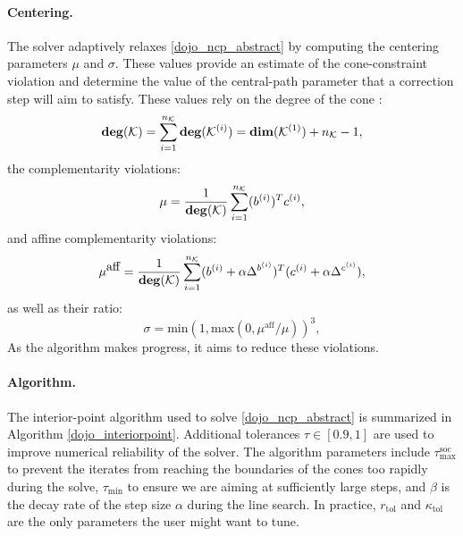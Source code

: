 \paragraph{Centering.}
The solver adaptively relaxes \eqref{dojo_ncp_abstract} by computing the centering parameters $\mu$ and $\sigma$. These values provide an estimate of the cone-constraint violation and determine the value of the central-path parameter that a correction step will aim to satisfy. These values rely on the degree of the cone \cite{vandenberghe2010cvxopt}:
\begin{equation}
	\mbox{\textbf{deg}}(\mathcal{K}) = \sum_{i=1}^{n_{\mathcal{K}}} \mbox{\textbf{deg}}(\mathcal{K}^{(i)}) = \mbox{\textbf{dim}}(\mathcal{K}^{(1)}) + n_{\mathcal{K}} - 1 \label{dojo_centering_0},
\end{equation}
the complementarity violations:
\begin{equation}
	\mu = \frac{1}{\mbox{\textbf{deg}}(\mathcal{K})} \sum_{i = 1}^{n_{\mathcal{K}}} (b^{(i)})^T c^{(i)}, \label{dojo_centering_1}
\end{equation}
and affine complementarity violations: 
\begin{equation}
	\mu^{\mbox{aff}} = \frac{1}{\mbox{\textbf{deg}}(\mathcal{K})} \sum_{i = 1}^{n_{\mathcal{K}}} (b^{(i)} + \alpha \Delta^{b^{(i)}})^T (c^{(i)} + \alpha \Delta^{c^{(i)}}), \label{dojo_centering_2}
\end{equation}
as well as their ratio:
\begin{equation}
	\sigma = \mbox{min}\left(1, \mbox{max} \left(0, \mu^{\mbox{aff}} / \mu \right) \right)^3,
	\label{dojo_centering_3}
\end{equation}
As the algorithm makes progress, it aims to reduce these violations.

\paragraph{Algorithm.}
The interior-point algorithm used to solve \eqref{dojo_ncp_abstract} is summarized in Algorithm \ref{dojo_interiorpoint}. Additional tolerances $\tau \in [0.9, 1]$ are used to improve numerical reliability of the solver. The algorithm parameters include $\tau^{\mbox{soc}}_{\mbox{max}}$ to prevent the iterates from reaching the boundaries of the cones too rapidly during the solve, $\tau_{\mbox{min}}$ to ensure we are aiming at sufficiently large steps, and $\beta$ is the decay rate of the step size $\alpha$ during the line search. In practice, $r_{\mbox{tol}}$ and $\kappa_{\mbox{tol}}$ are the only parameters the user might want to tune.

